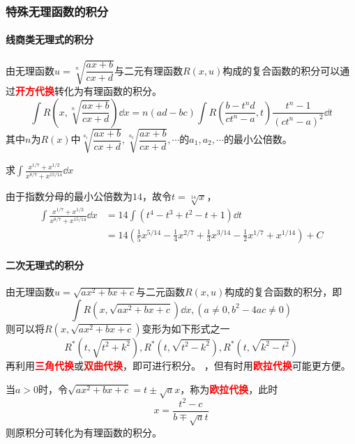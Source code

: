 \subsubsection{特殊无理函数的积分}
\paragraph{线商类无理式的积分}
由无理函数$u=\sqrt[n]{\dfrac{ax+b}{cx+d}}$与二元有理函数$R(x,u)$构成的复合函数的积分可以通过\textcolor{red}{\textbf{\textsf{开方代换}}}转化为有理函数的积分。
\[ \int R\left(x,\sqrt[n]{\frac{ax+b}{cx+d}}\right)\dd{x} = n(ad-bc)\int R\left(\frac{b-t^nd}{ct^n-a},t\right)\frac{t^n-1}{(ct^n-a)^2}\dd{t} \]
其中$n$为$R(x)$中$\sqrt[a_1]{\dfrac{ax+b}{cx+d}},\sqrt[a_2]{\dfrac{ax+b}{cx+d}},\cdots$的$a_1,a_2,\cdots$的最小公倍数。
\begin{example}
    求$\displaystyle\int\frac{x^{1/7}+x^{1/2}}{x^{8/7}+x^{15/14}}\dd{x}$
\end{example}
\begin{solution}
    由于指数分母的最小公倍数为$14$，故令$t=\sqrt[14]{x}$，
    \begin{align*}
        \int\frac{x^{1/7}+x^{1/2}}{x^{8/7}+x^{15/14}}\dd{x} & = 14\int(t^4-t^3+t^2-t+1)\dd{t}                                                                        \\
                                                            & =14(\frac{1}{5}x^{5/14} - \frac{1}{4}x^{2/7} + \frac{1}{3}x^{3/14} - \frac{1}{2}x^{1/7} + x^{1/14}) +C
    \end{align*}
\end{solution}

\paragraph{二次无理式的积分}
由无理函数$u=\sqrt{ax^2+bx+c}$与二元函数$R(x,u)$构成的复合函数的积分，即
\[ \int R(x,\sqrt{ax^2+bx+c})\dd{x}, (a\neq 0, b^2-4ac\neq 0) \]
则可以将$R(x,\sqrt{ax^2+bx+c})$变形为如下形式之一
\[ R^*(t, \sqrt{t^2+k^2}), R^*(t, \sqrt{t^2-k^2}), R^*(t, \sqrt{k^2-t^2}) \]
再利用\textcolor{red}{\textsf{\textbf{三角代换}}}或\textcolor{red}{\textsf{\textbf{双曲代换}}}，即可进行积分。
，但有时用\textcolor{red}{\textsf{\textbf{欧拉代换}}}可能更方便。

当$a>0$时，令$\sqrt{ax^2+bx+c}=t\pm\sqrt{a}x$，称为\textcolor{red}{\textsf{\textbf{欧拉代换}}}，此时
\[x=\frac{t^2-c}{b\mp\sqrt{a}t}\]
则原积分可转化为有理函数的积分。

